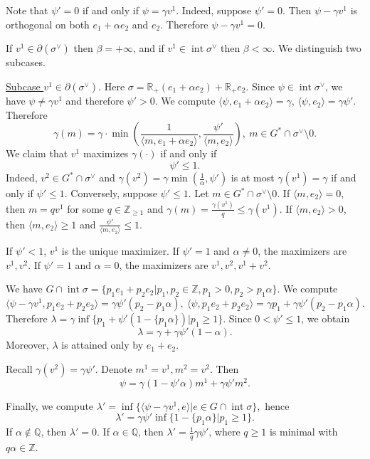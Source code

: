 \documentclass[12pt,reqno]{amsart}
\newcommand{\Q}{{\mathbb Q}}
\newcommand{\Z}{{\mathbb Z}}
\newcommand{\R}{{\mathbb R}}
\newcommand{\Int}{\operatorname{int}}
\theoremstyle{plain}
\theoremstyle{definition}
\theoremstyle{remark}
\begin{document}
Note that $\psi'=0$ if and only if $\psi=\gamma v^1$.
Indeed, suppose $\psi'=0$. Then $\psi-\gamma v^1$ is orthogonal on
both $e_1+\alpha e_2$ and $e_2$. Therefore $\psi-\gamma v^1=0$. 

If $v^1\in \partial(\sigma^\vee)$ then $\beta=+\infty$, and 
if $v^1\in \Int \sigma^\vee$ then $\beta<\infty$.
We distinguish two subcases.

\underline{Subcase $v^1\in \partial(\sigma^\vee)$}. 
Here $\sigma=\R_+(e_1+\alpha e_2)+\R_+ e_2$. Since $\psi\in \Int\sigma^\vee$,
we have $\psi\ne \gamma v^1$ and therefore $\psi'> 0$. We compute $\langle \psi,e_1+\alpha e_2\rangle=\gamma$,
$\langle \psi,e_2\rangle=\gamma\psi'$. Therefore
$$
\gamma(m)=\gamma \cdot \min( 
\frac{1}{\langle m,e_1+\alpha e_2\rangle},\frac{\psi'}{\langle m,e_2\rangle}), \ m\in G^*\cap \sigma^\vee\setminus 0.
$$
We claim that $v^1$ maximizes $\gamma(\cdot)$ if and only if
$$
\psi'\le 1.
$$ 
Indeed, $v^2\in G^*\cap \sigma^\vee$ and 
$\gamma(v^2)=\gamma\min(\frac{1}{\alpha},\psi')$ is at most $\gamma(v^1)=\gamma$
if and only if $\psi'\le 1$. Conversely, suppose $\psi'\le 1$. Let $m\in G^*\cap \sigma^\vee\setminus 0$.
If $\langle m,e_2\rangle=0$, then $m=qv^1$ for some $q\in \Z_{\ge 1}$ and 
$\gamma(m)=\frac{\gamma(v^1)}{q}\le \gamma(v^1)$. If $\langle m,e_2\rangle>0$, then 
$\langle m,e_2\rangle\ge 1$ and $\frac{\psi'}{\langle m,e_2\rangle} \le 1$.

If $\psi'< 1$, $v^1$ is the unique maximizer. If $\psi'=1$ and $\alpha\ne 0$, the maximizers are $v^1,v^2$.
If $\psi'=1$ and $\alpha=0$, the maximizers are $v^1,v^2,v^1+v^2$.

We have $G\cap \Int \sigma =\{p_1e_1+p_2e_2\vert p_1,p_2\in \Z, p_1>0,
p_2>p_1\alpha\}$. We compute 
$$
\langle \psi-\gamma v^1,p_1e_2+p_2e_2\rangle=\gamma \psi' (p_2-p_1\alpha),
\
\langle \psi,p_1e_2+p_2e_2\rangle=
\gamma p_1+\gamma \psi' (p_2-p_1\alpha).
$$ 
Therefore
$
\lambda=\gamma\inf\{p_1+\psi'(1-\{p_1\alpha\}) \vert p_1\ge 1\}.
$
Since $0< \psi'\le 1$, we obtain
$$
\lambda=\gamma+\gamma \psi'(1-\alpha).
$$
Moreover, $\lambda$ is attained only by $e_1+e_2$.

Recall $\gamma(v^2)=\gamma \psi'$. Denote $m^1=v^1,m^2=v^2$. Then
$$
\psi=\gamma(1-\psi'\alpha)m^1+\gamma\psi' m^2.
$$

Finally, we compute
$
\lambda'=\inf\{\langle \psi-\gamma v^1,e\rangle \vert e\in G\cap \Int \sigma \},
$
hence
$$
\lambda'=\gamma\psi'\inf\{1-\{p_1\alpha\} \vert p_1\ge 1\}.
$$
If $\alpha\notin \Q$, then $\lambda'=0$. If $\alpha\in \Q$, then
$\lambda'=\frac{1}{q}\gamma\psi'$, where $q\ge 1$ is minimal with $q\alpha\in \Z$.
\end{document}
